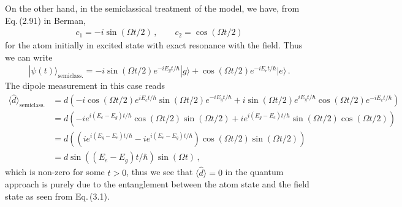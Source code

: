 \documentclass[11pt, oneside]{book}
\theoremstyle{break}
\theoremstyle{break}
\begin{document}
On the other hand, in the semiclassical treatment of the model, we have, from Eq.\,(2.91) in Berman,
\begin{align*}
c_1 = -i \sin(\Omega t/2)\,,\qquad
c_2 = \cos(\Omega t/2)
\end{align*}
for the atom initially in excited state with exact resonance with the field. Thus we can write
\begin{align*}
|\psi(t)\rangle_{\text{semiclass.}} = -i\sin(\Omega t/2) e^{-iE_gt/\hbar}|g\rangle +\cos(\Omega t/2) e^{-i E_e t/\hbar}|e\rangle\,. 
\end{align*}
The dipole measurement in this case reads
\begin{align*}
\langle \hat{d}\rangle_{\text{semiclass.}} &= d\left(-i\cos(\Omega t/2)e^{iE_et/\hbar}\sin(\Omega t/2) e^{-iE_gt/\hbar} + i\sin(\Omega t/2) e^{iE_gt/\hbar}\cos(\Omega t/2) e^{-i E_et/\hbar} \right)\\
&= d\left(-ie^{i(E_e-E_g)t/\hbar}\cos(\Omega t/2)\sin(\Omega t/2)+ ie^{i(E_g-E_e)t/\hbar} \sin(\Omega t/2) \cos(\Omega t/2)\right)\\
&= d\left((ie^{i(E_g-E_e)t/\hbar}-ie^{i(E_e-E_g)t/\hbar})\cos(\Omega t/2)\sin(\Omega t/2)\right)\\
&= d \sin((E_e-E_g)t/\hbar) \sin(\Omega t)\,,
\end{align*}
which is non-zero for some $t >0$, thus we see that $\langle \hat{d}\rangle = 0$ in the quantum approach is purely due to the entanglement between the atom state and the field state as seen from Eq.\,(3.1). 
\end{document}
